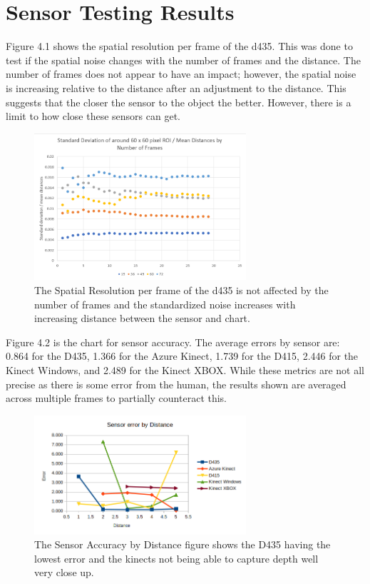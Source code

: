 \section{Sensor Testing Results}
Figure 4.1 shows the spatial resolution per frame of the d435. This was done to test if the spatial noise changes with the number of frames and the distance. The number of frames does not appear to have an impact; however, the spatial noise is increasing relative to the distance after an adjustment to the distance. This suggests that the closer the sensor to the object the better. However, there is a limit to how close these sensors can get.
\begin{figure}[!htb]
	\caption{The Spatial Resolution per frame of the d435 is not affected by the number of frames and the standardized noise increases with increasing distance between the sensor and chart.}
	\centering
	\includegraphics[width=0.7\textwidth]{images/d435_spatial_resolution.png}
\end{figure}

Figure 4.2 is the chart for sensor accuracy. The average errors by sensor are: 0.864 for the D435, 1.366 for the Azure Kinect, 1.739 for the D415, 2.446 for the Kinect Windows, and 2.489 for the Kinect XBOX. While these metrics are not all precise as there is some error from the human, the results shown are averaged across multiple frames to partially counteract this.
\begin{figure}[!htb]
	\caption{The Sensor Accuracy by Distance figure shows the D435 having the lowest error and the kinects not being able to capture depth well very close up.}
	\centering
	\includegraphics[width=0.7\textwidth]{images/sensor_accuracy.png}
\end{figure}

